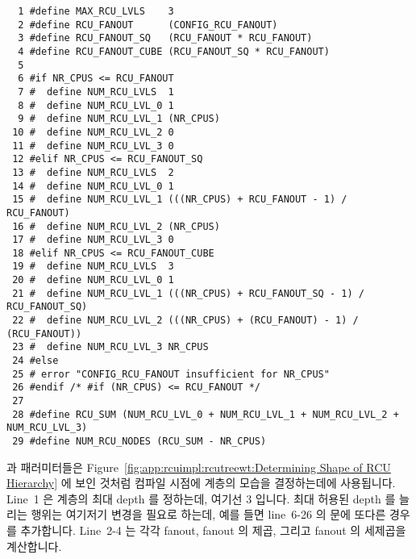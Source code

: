 \begin{figure*}[tbp]
{
\scriptsize
\begin{verbatim}
  1 #define MAX_RCU_LVLS    3
  2 #define RCU_FANOUT      (CONFIG_RCU_FANOUT)
  3 #define RCU_FANOUT_SQ   (RCU_FANOUT * RCU_FANOUT)
  4 #define RCU_FANOUT_CUBE (RCU_FANOUT_SQ * RCU_FANOUT)
  5
  6 #if NR_CPUS <= RCU_FANOUT
  7 #  define NUM_RCU_LVLS  1
  8 #  define NUM_RCU_LVL_0 1
  9 #  define NUM_RCU_LVL_1 (NR_CPUS)
 10 #  define NUM_RCU_LVL_2 0
 11 #  define NUM_RCU_LVL_3 0
 12 #elif NR_CPUS <= RCU_FANOUT_SQ
 13 #  define NUM_RCU_LVLS  2
 14 #  define NUM_RCU_LVL_0 1
 15 #  define NUM_RCU_LVL_1 (((NR_CPUS) + RCU_FANOUT - 1) / RCU_FANOUT)
 16 #  define NUM_RCU_LVL_2 (NR_CPUS)
 17 #  define NUM_RCU_LVL_3 0
 18 #elif NR_CPUS <= RCU_FANOUT_CUBE
 19 #  define NUM_RCU_LVLS  3
 20 #  define NUM_RCU_LVL_0 1
 21 #  define NUM_RCU_LVL_1 (((NR_CPUS) + RCU_FANOUT_SQ - 1) / RCU_FANOUT_SQ)
 22 #  define NUM_RCU_LVL_2 (((NR_CPUS) + (RCU_FANOUT) - 1) / (RCU_FANOUT))
 23 #  define NUM_RCU_LVL_3 NR_CPUS
 24 #else
 25 # error "CONFIG_RCU_FANOUT insufficient for NR_CPUS"
 26 #endif /* #if (NR_CPUS) <= RCU_FANOUT */
 27
 28 #define RCU_SUM (NUM_RCU_LVL_0 + NUM_RCU_LVL_1 + NUM_RCU_LVL_2 + NUM_RCU_LVL_3)
 29 #define NUM_RCU_NODES (RCU_SUM - NR_CPUS)
\end{verbatim}
}
\caption{Determining Shape of RCU Hierarchy}
\label{fig:app:rcuimpl:rcutreewt:Determining Shape of RCU Hierarchy}
\end{figure*}

 과  패러미터들은
Figure~\ref{fig:app:rcuimpl:rcutreewt:Determining Shape of RCU Hierarchy} 에
보인 것처럼 컴파일 시점에  계층의 모습을 결정하는데에 사용됩니다.
Line~1 은  계층의 최대 depth 를 정하는데, 여기선 3 입니다.
최대 허용된 depth 를 늘리는 행위는 여기저기 변경을 필요로 하는데, 예를 들면
line~6-26 의  문에 또다른 경우를 추가합니다.
Line~2-4 는 각각 fanout, fanout 의 제곱, 그리고 fanout 의 세제곱을 계산합니다.
\iffalse

The \co{CONFIG_RCU_FANOUT} and \co{NR_CPUS} parameters are used to
determine the shape of the \co{rcu_node} hierarchy at compile time,
as shown in
Figure~\ref{fig:app:rcuimpl:rcutreewt:Determining Shape of RCU Hierarchy}.
Line~1 defines the maximum depth of the \co{rcu_node} hierarchy,
currently three.
Note that increasing the maximum permitted depth requires changes
elsewhere, for example, adding another leg to the \co{#if}
statement running from lines~6-26.
Lines~2-4 compute the fanout, the square of the fanout, and the cube
of the fanout, respectively.
\fi

